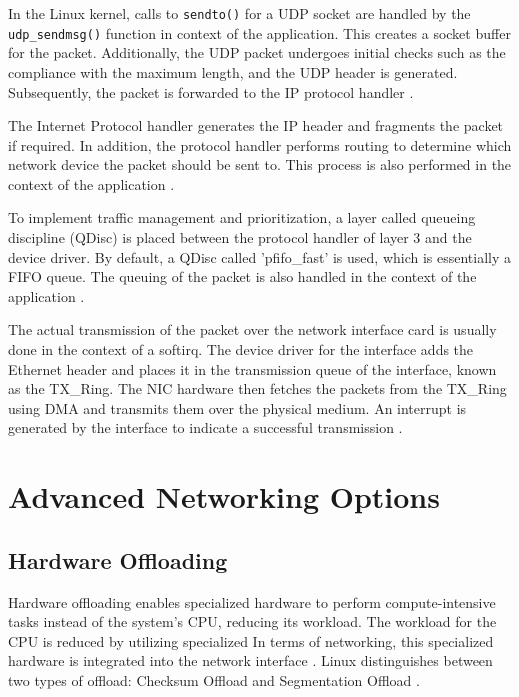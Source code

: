 In the Linux kernel, calls to \texttt{sendto()} for a UDP socket are handled by the \texttt{udp\_sendmsg()} function in context of the application. This creates a socket buffer for the packet. Additionally, the UDP packet undergoes initial checks such as the compliance with the maximum length, and the UDP header is generated. Subsequently, the packet is forwarded to the IP protocol handler \cite{lins01}.

The Internet Protocol handler generates the IP header and fragments the packet if required. In addition, the protocol handler performs routing to determine which network device the packet should be sent to. This process is also performed in the context of the application \cite{lins01, lins03}.

To implement traffic management and prioritization, a layer called queueing discipline (QDisc) is placed between the protocol handler of layer 3 and the device driver. By default, a QDisc called 'pfifo\_fast' is used, which is essentially a FIFO queue. The queuing of the packet is also handled in the context of the application \cite{lins03, lins12}.

The actual transmission of the packet over the network interface card is usually done in the context of a softirq. The device driver for the interface adds the Ethernet header and places it in the transmission queue of the interface, known as the TX\_Ring. The NIC hardware then fetches the packets from the TX\_Ring using DMA and transmits them over the physical medium. An interrupt is generated by the interface to indicate a successful transmission \cite{lins06, lins14}.


\clearpage

\section{Advanced Networking Options}

\subsection{Hardware Offloading} \label{chap:HWOffload}
Hardware offloading enables specialized hardware to perform compute-intensive tasks instead of the system's CPU, reducing its workload. The workload for the CPU is reduced by utilizing specialized In terms of networking, this specialized hardware is integrated into the network interface \cite{tuning01}. Linux distinguishes between two types of offload: Checksum Offload and Segmentation Offload \cite{tuning02, tuning03}.

